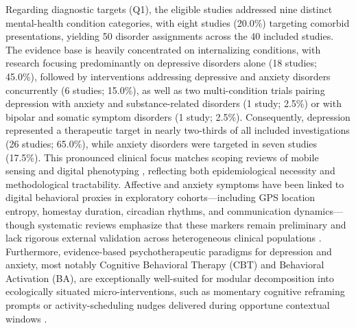 Regarding diagnostic targets (Q1), the eligible studies addressed nine distinct mental-health condition categories, with eight studies (20.0\%) targeting comorbid presentations, yielding 50 disorder assignments across the 40 included studies. The evidence base is heavily concentrated on internalizing conditions, with research focusing predominantly on depressive disorders alone (18 studies; 45.0\%), followed by interventions addressing depressive and anxiety disorders concurrently (6 studies; 15.0\%), as well as two multi-condition trials pairing depression with anxiety and substance-related disorders (1 study; 2.5\%) or with bipolar and somatic symptom disorders (1 study; 2.5\%). Consequently, depression represented a therapeutic target in nearly two-thirds of all included investigations (26 studies; 65.0\%), while anxiety disorders were targeted in seven studies (17.5\%). This pronounced clinical focus matches scoping reviews of mobile sensing and digital phenotyping \cite{choi2024digital, busshart2026digitalphenotyping, dumas2026digitalphenotyping}, reflecting both epidemiological necessity and methodological tractability. Affective and anxiety symptoms have been linked to digital behavioral proxies in exploratory cohorts—including GPS location entropy, homestay duration, circadian rhythms, and communication dynamics—though systematic reviews emphasize that these markers remain preliminary and lack rigorous external validation across heterogeneous clinical populations \cite{saeb2015mobilephone, deangel2022passivemonitoring, shen2025passive}. Furthermore, evidence-based psychotherapeutic paradigms for depression and anxiety, most notably Cognitive Behavioral Therapy (CBT) and Behavioral Activation (BA), are exceptionally well-suited for modular decomposition into ecologically situated micro-interventions, such as momentary cognitive reframing prompts or activity-scheduling nudges delivered during opportune contextual windows \cite{balaskas2021ecological, leaning2024smartphone, kang2026behavioralactivation}.

